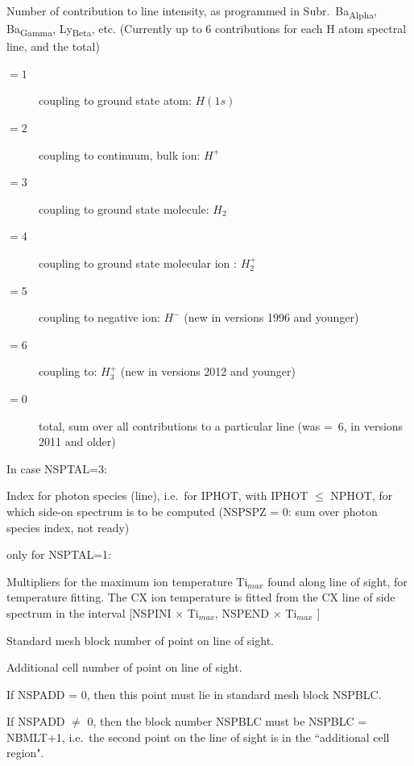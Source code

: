 \begin{description}
        Number of contribution to line intensity, as programmed in Subr.\
        Ba\textsubscript{Alpha}, Ba\textsubscript{Gamma}, Ly\textsubscript{Beta}, etc.
        (Currently up to 6 contributions for each H atom spectral line, and the total)
        \begin{description}
          \item[$= 1$] coupling to ground state atom: $H(1s)$
          \item[$= 2$] coupling to continuum, bulk ion: $H^+$
          \item[$= 3$] coupling to
                ground state molecule: $H_2$
          \item[$= 4$] coupling to ground state molecular
                ion : $H_2^+$
          \item[$= 5$] coupling to negative ion: $H^-$ (new in versions
                1996 and younger)
          \item[$= 6$] coupling to: $H_3^+$  (new in versions 2012 and
                younger)
          \item[$= 0$] total, sum over all contributions to a particular line
                (was =~6, in versions 2011 and older)
        \end{description}

        In case NSPTAL=3:

        Index for photon species (line), i.e.\ for IPHOT, with IPHOT $\leq$ NPHOT, for
        which side-on spectrum is to be computed (NSPSPZ = 0: sum over photon species
        index, not ready)
  \item[NSPINI, NSPEND] only for NSPTAL=1:

        Multipliers for the maximum ion temperature Ti$_{max}$ found along line of
        sight, for temperature fitting.
        The CX ion temperature	is fitted from the CX line of side spectrum in the
        interval [NSPINI $\times$ Ti$_{max}$, NSPEND $\times$ Ti$_{max}$ ]

  \item[NSPBLC] Standard mesh block number of  point on line of
        sight.
  \item[NSPADD] Additional cell number of  point on line of sight.

        If NSPADD = 0, then this  point must lie in standard mesh block
        NSPBLC.

        If NSPADD $\ne$ 0, then the block number NSPBLC must be NSPBLC = NBMLT+1, i.e.\
        the second point on the line of sight is in the ``additional cell region".
  \item[EMIN1, EMAX1] ~ 


\end{description}
